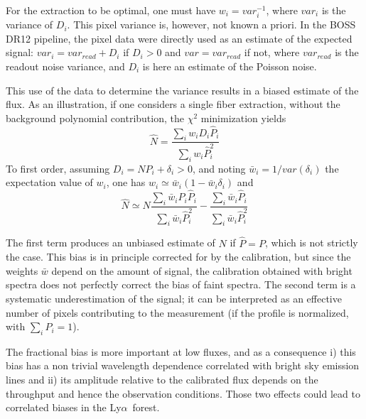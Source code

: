 \documentclass{aa}
\newcommand{\Lya}{Ly$\alpha$~}
\begin{document}
For the extraction to be optimal, one must have $w_{i} = var_{i}^{-1}$, where  $var_{i}$ is the variance of $D_{i}$. 
This pixel variance is, however, not known a priori.
In the BOSS DR12 pipeline, the pixel data were directly used as an estimate of the expected signal: 
$var_{i} = var_{read} + D_{i}$ if $D_{i}>0$ and $var = var_{read}$ if not, where $var_{read}$ is the readout noise variance, and
 $D_{i}$ is here an estimate of the Poisson noise.

This use of the data to determine the variance results in a biased
estimate of the flux.
As an illustration, if one considers a single fiber extraction, 
without the background polynomial
contribution, the $\chi^2$ minimization yields
$$ \hat{N} = \frac{ \sum_{i} w_{i} D_{i} \hat{P}_{i} }{ \sum_{i} w_{i} \hat{P}_{i}^2 }$$
To first order, assuming $D_i= N P_i + \delta_i >0$, and noting $\bar{w}_i = 1/var(\delta_{i})$ the expectation value of $w_i$,  one has
$w_{i} \simeq \bar{w}_{i} (1 - \bar{w}_{i} \delta_i)$
and
\begin{equation}
\hat{N} \simeq  N \frac{ \sum_{i} \bar{w}_{i} P_i \hat{P}_{i} }{ \sum_{i} \bar{w}_{i} \hat{P}_{i}^2 } - \frac{ \sum_{i} \bar{w}_i \hat{P}_{i} }{ \sum_{i} \bar{w}_{i} \hat{P}_{i}^2} \label{eq:bias}
\end{equation}

The first term produces an unbiased estimate of $N$ if $\hat{P}=P$,
which is not strictly the case. This bias is in principle corrected for 
by the calibration, but since the weights $\bar{w}$ depend on the 
amount of signal, the calibration obtained with bright spectra does 
not perfectly correct the bias of faint spectra. The second term 
is a systematic underestimation of the signal; it can be interpreted 
as an effective number of pixels contributing to the measurement 
(if the profile is normalized, with $\sum_i P_i = 1$).

The fractional bias is more important at low fluxes, and as a consequence  
i) this bias has a non trivial wavelength dependence correlated with 
bright sky emission lines and ii) its amplitude relative to the calibrated 
flux depends on the throughput and hence the observation conditions. 
Those two effects could lead to correlated biases in the \Lya forest.

 
\end{document}
